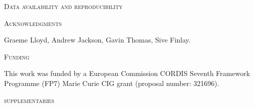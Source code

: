 \documentclass[12pt,letterpaper]{article}
\renewcommand{\section}[1]{%
\bigskip
\begin{center}
\begin{Large}
\normalfont\scshape #1
\medskip
\end{Large}
\end{center}}
\begin{document}

\section{Data availability and reproducibility}

\section{Acknowledgments}
Graeme Lloyd, Andrew Jackson, Gavin Thomas, Sive Finlay.

\section{Funding} %
This work was funded by a European Commission CORDIS Seventh Framework Programme (FP7) Marie Curie CIG grant (proposal number: 321696).





\section{supplementaries}
\end{document}
